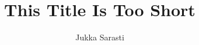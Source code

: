 \documentclass[12pt,a4paper]{article}
\author{Jukka Sarasti}
\title{This Title Is Too Short}
\begin{document}
	\coverboxtrue
	\makecoverpage
	\makedatasheet
\end{document}
